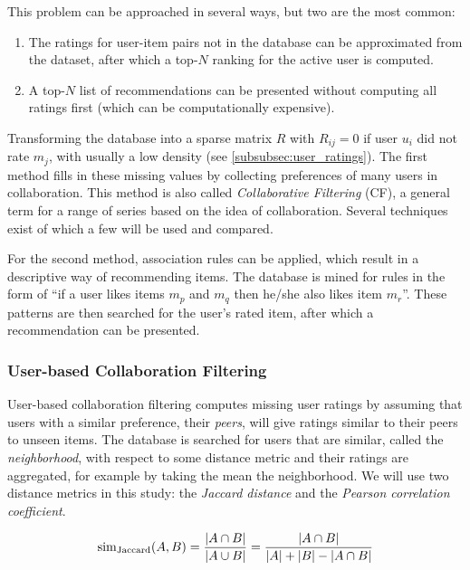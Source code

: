 This problem can be approached in several ways, but two are the most common:

\begin{enumerate}
	\item The ratings for user-item pairs not in the database can be approximated from the dataset, after which a top-$N$ ranking for the active user is computed.
	\item A top-$N$ list of recommendations can be presented without computing all ratings first (which can be computationally expensive).
\end{enumerate}

Transforming the database into a sparse matrix $R$ with $R_{ij}=0$ if user $u_i$ did not rate $m_j$, with usually a low density (see \cref{subsubsec:user_ratings}).
The first method fills in these missing values by collecting preferences of many users in collaboration.
This method is also called \emph{Collaborative Filtering} (CF), a general term for a range of series based on the idea of collaboration.
Several techniques exist of which a few will be used and compared.

For the second method, association rules can be applied, which result in a descriptive way of recommending items.
The database is mined for rules in the form of ``if a user likes items $m_p$ and $m_q$ then he/she also likes item $m_r$''.
These patterns are then searched for the user's rated item, after which a recommendation can be presented.




\subsubsection{User-based Collaboration Filtering}
\label{subsubsec:user_based_cf}

User-based collaboration filtering computes missing user ratings by assuming that users with a similar preference, their \emph{peers}, will give ratings similar to their peers to unseen items.
The database is searched for users that are similar, called the \emph{neighborhood}, with respect to some distance metric and their ratings are aggregated, for example by taking the mean the neighborhood.
We will use two distance metrics in this study: the \emph{Jaccard distance} and the \emph{Pearson correlation coefficient}.

\begin{equation}
	  \mathrm{sim}_{\mathrm{Jaccard}}(A,B) = {{|A \cap B|}\over{|A \cup B|}} = {{|A \cap B|}\over{|A| + |B| - |A \cap B|}}
\end{equation}

